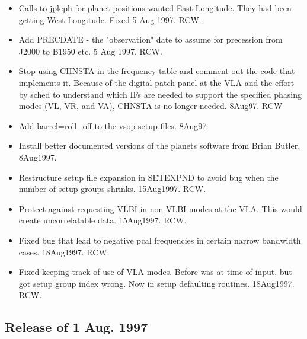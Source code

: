 \documentclass{report}
\begin{document}
\begin{itemize}

\item Calls to jpleph for planet positions wanted East Longitude.  They
      had been getting West Longitude.  Fixed 5 Aug 1997.  RCW.

\item Add PRECDATE - the "observation" date to assume for precession
      from J2000 to B1950 etc.  5 Aug 1997.  RCW.

\item Stop using CHNSTA in the frequency table and comment out the code
      that implements it.  Because of the digital patch panel at the VLA
      and the effort by sched to understand which IFs are needed to support
      the specified phasing modes (VL, VR, and VA), CHNSTA is no longer
      needed.  8Aug97. RCW

\item Add barrel=roll\_off to the vsop setup files.  8Aug97

\item Install better documented versions of the planets software
      from Brian Butler. 8Aug1997.

\item Restructure setup file expansion in SETEXPND to avoid bug when
      the number of setup groups shrinks.  15Aug1997.  RCW.

\item Protect against requesting VLBI in non-VLBI modes at the VLA.
      This would create uncorrelatable data.  15Aug1997. RCW.

\item Fixed bug that lead to negative pcal frequencies in certain narrow
      bandwidth cases.  18Aug1997.  RCW.

\item Fixed keeping track of use of VLA modes.  Before was at time of
      input, but got setup group index wrong.  Now in setup defaulting
      routines.  18Aug1997.  RCW.

\end{itemize}

\subsection{\label{SSSEC:AUG97}Release of 1 Aug. 1997}
\end{document}
